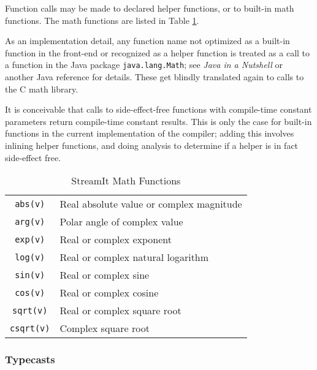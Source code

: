 \documentclass[11pt]{article}
\begin{document}
Function calls may be made to declared helper functions, or to
built-in math functions.  The math functions are listed in Table
\ref{tab:math-functions}.

\begin{note}
  As an implementation detail, any function name not optimized as a
  built-in function in the front-end or recognized as a %
  helper function is treated as a call to a function in the Java
  package \lstinline|java.lang.Math|; see \emph{Java in a Nutshell} or
  another Java reference for details.  These get blindly translated
  again to calls to the C math library.
\end{note}

\begin{note}
  It is conceivable that calls to side-effect-free functions with
  compile-time constant parameters return compile-time constant
  results.  This is only the case for built-in functions in the
  current implementation of the compiler; adding this involves
  inlining helper functions, and doing analysis to determine if a
  helper is in fact side-effect free.
\end{note}

\begin{table}[htbp]
  \begin{center}
    \begin{tabular}{cl}
      \toprule
      \texttt{abs(v)} & Real absolute value or complex magnitude \\
      \texttt{arg(v)} & Polar angle of complex value \\
      \texttt{exp(v)} & Real or complex exponent \\
      \texttt{log(v)} & Real or complex natural logarithm \\
      \texttt{sin(v)} & Real or complex sine \\
      \texttt{cos(v)} & Real or complex cosine \\
      \texttt{sqrt(v)} & Real or complex square root \\
      \texttt{csqrt(v)} & Complex square root \\
      \bottomrule
    \end{tabular}
    \caption{StreamIt Math Functions}
    \label{tab:math-functions}
  \end{center}
\end{table}

\subsubsection{Typecasts}
\end{document}
